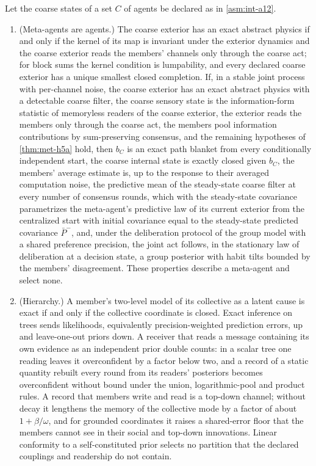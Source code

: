 \begin{hypothesis}\label{hyp:int-h5}
Let the coarse states of a set $C$ of agents be declared as in \cref{asm:int-a12}.
\begin{enumerate}
\item[(a)] (Meta-agents are agents.) The coarse exterior has an exact abstract physics if and only if the kernel of its map is invariant under the exterior dynamics and the coarse exterior reads the members' channels only through the coarse act; for block sums the kernel condition is lumpability, and every declared coarse exterior has a unique smallest closed completion. If, in a stable joint process with per-channel noise, the coarse exterior has an exact abstract physics with a detectable coarse filter, the coarse sensory state is the information-form statistic of memoryless readers of the coarse exterior, the exterior reads the members only through the coarse act, the members pool information contributions by sum-preserving consensus, and the remaining hypotheses of \cref{thm:met-h5a} hold, then $b_C$ is an exact path blanket from every conditionally independent start, the coarse internal state is exactly closed given $b_C$, the members' average estimate is, up to the response to their averaged computation noise, the predictive mean of the steady-state coarse filter at every number of consensus rounds, which with the steady-state covariance parametrizes the meta-agent's predictive law of its current exterior from the centralized start with initial covariance equal to the steady-state predicted covariance $\bar P^-$, and, under the deliberation protocol of the group model with a shared preference precision, the joint act follows, in the stationary law of deliberation at a decision state, a group posterior with habit tilts bounded by the members' disagreement. These properties describe a meta-agent and select none.
\item[(b)] (Hierarchy.) A member's two-level model of its collective as a latent cause is exact if and only if the collective coordinate is closed. Exact inference on trees sends likelihoods, equivalently precision-weighted prediction errors, up and leave-one-out priors down. A receiver that reads a message containing its own evidence as an independent prior double counts: in a scalar tree one reading leaves it overconfident by a factor below two, and a record of a static quantity rebuilt every round from its readers' posteriors becomes overconfident without bound under the union, logarithmic-pool and product rules. A record that members write and read is a top-down channel; without decay it lengthens the memory of the collective mode by a factor of about $1+\beta/\omega$, and for grounded coordinates it raises a shared-error floor that the members cannot see in their social and top-down innovations. Linear conformity to a self-constituted prior selects no partition that the declared couplings and readership do not contain.

\end{enumerate}
\end{hypothesis}
